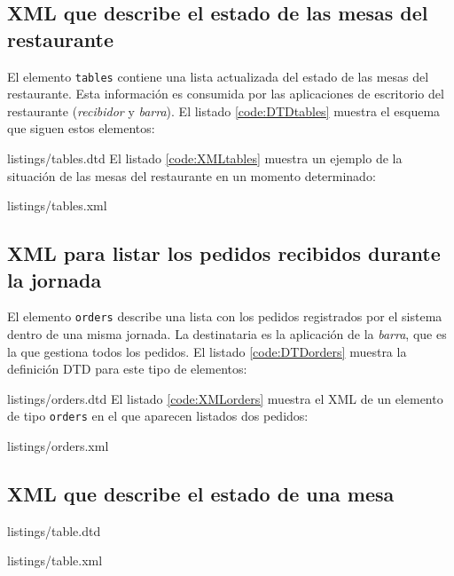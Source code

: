 \subsection{\acs{XML} que describe el estado de las mesas del restaurante}
El elemento \texttt{tables} contiene una lista actualizada del estado de las
mesas del restaurante. Esta información es consumida por las aplicaciones
de escritorio del restaurante (\emph{recibidor} y \emph{barra}). El listado
\ref{code:DTDtables} muestra el esquema que siguen estos elementos:

{listings/tables.dtd}
El listado \ref{code:XMLtables} muestra un ejemplo de la situación de las
mesas del restaurante en un momento determinado:

{listings/tables.xml}

\subsection{\acs{XML} para listar los pedidos recibidos durante la jornada}
El elemento \texttt{orders} describe una lista con los pedidos registrados
por el sistema dentro de una misma jornada. La destinataria es la aplicación
de la \emph{barra}, que es la que gestiona todos los pedidos. El listado
\ref{code:DTDorders} muestra la definición \acs{DTD} para este tipo de
elementos:

{listings/orders.dtd}
El listado \ref{code:XMLorders} muestra el \acs{XML} de un elemento de tipo
\texttt{orders} en el que aparecen listados dos pedidos:

{listings/orders.xml}

\subsection{\acs{XML} que describe el estado de una mesa}

{listings/table.dtd}

{listings/table.xml}

